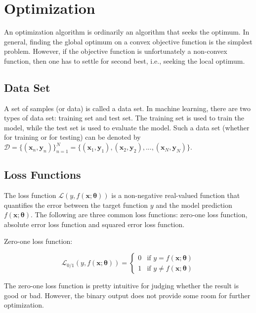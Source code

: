 \documentclass[
	parskip, 			   %
	twoside, 			   %
	DIV=14, 			   %
	BCOR=15.0mm, 		   %
	headsepline, 		   %
	open=right, 		   %
	captions=tableheading, %
	bibliography=totoc,    %
	numbers=noenddot       %
]{scrreprt}
\begin{document}
\section{Optimization}
An optimization algorithm is ordinarily an algorithm that seeks the optimum. In general, finding the global optimum on a convex objective function is the simplest problem. However, if the objective function is unfortunately a non-convex function, then one has to settle for second best, i.e., seeking the local optimum.

\subsection{Data Set}
A set of samples (or data) is called a data set. In machine learning, there are two types of data set: training set and test set. The training set is used to train the model, while the test set is used to evaluate the model. Such a data set (whether for training or for testing) can be denoted by $\mathcal{D}=\{ (\mathbf{x}_{n}, \mathbf{y}_{n}) \}_{n=1}^{N} = \{ (\mathbf{x}_{1}, \mathbf{y}_{1}),  (\mathbf{x}_{2}, \mathbf{y}_{2}), ..., (\mathbf{x}_{N}, \mathbf{y}_{N}) \}$.

\subsection{Loss Functions}
The loss function $\mathcal{L}\left( y,f(\mathbf{x};\mathbf{\theta}) \right)$ is a non-negative real-valued function that quantifies the error between the target function $y$ and the model prediction $f(\mathbf{x};\mathbf{\theta})$. The following are three common loss functions: zero-one loss function, absolute error loss function and squared error loss function.

Zero-one loss function:

\begin{equation}
    \label{eq:zero_one_loss}
    \mathcal{L}_{0/1}\left( y,f \left(\mathbf{x};\mathbf{\theta} \right) \right) = \begin{cases} 0 & \text{if } y=f(\mathbf{x};\mathbf{\theta}) \\ 1 & \text{if } y \neq f(\mathbf{x};\mathbf{\theta})
    \end{cases}
\end{equation}

The zero-one loss function is pretty intuitive for judging whether the result is good or bad. However, the binary output does not provide some room for further optimization.
\end{document}

